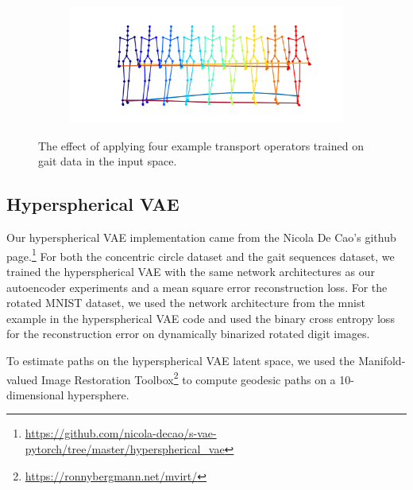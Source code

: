 \documentclass[letterpaper]{article} %
\begin{document}
\begin{figure}[ht]
\begin{subfigure}[b]{0.62\columnwidth}
  \centering
	\includegraphics[width=0.99\columnwidth]{gaitTransOpt_8.png}
	\caption{}
	\label{subfig:inputGait8}
\end{subfigure}




  \caption{\label{fig:inputGait} The effect of applying four example transport operators trained on gait data in the input space. }

\end{figure}

\subsection{Hyperspherical VAE}\label{sec:hvae}
Our hyperspherical VAE implementation came from the Nicola De Cao's github page.\footnote{\url{https://github.com/nicola-decao/s-vae-pytorch/tree/master/hyperspherical_vae}} For both the concentric circle dataset and the gait sequences dataset, we trained the hyperspherical VAE with the same network architectures as our autoencoder experiments and a mean square error reconstruction loss. For the rotated MNIST dataset, we used the network architecture from the mnist example in the hyperspherical VAE code and used the binary cross entropy loss for the reconstruction error on dynamically binarized rotated digit images.

To estimate paths on the hyperspherical VAE latent space, we used the Manifold-valued Image Restoration Toolbox\footnote{\url{https://ronnybergmann.net/mvirt/}} to compute geodesic paths on a 10-dimensional hypersphere.
\end{document}

